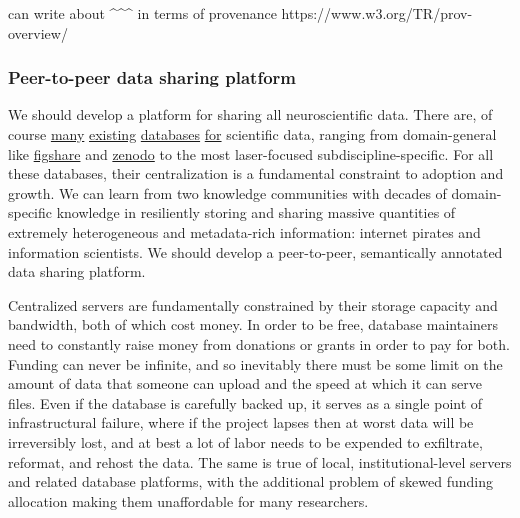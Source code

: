 \documentclass[nohyper]{tufte-book-jls}
\begin{document}
\begin{leftbar}
\begin{leftbar}
\begin{leftbar}
can write about \^{}\^{}\^{} in terms of provenance
https://www.w3.org/TR/prov-overview/
\end{leftbar}
\end{leftbar}
\end{leftbar}

\hypertarget{peer-to-peer-data-sharing-platform}{%
\subsubsection{Peer-to-peer data sharing
platform}\label{peer-to-peer-data-sharing-platform}}

We should develop a platform for sharing all neuroscientific data. There
are, of course \href{https://www.dandiarchive.org/}{many}
\href{https://openneuro.org/}{existing}
\href{https://www.brainminds.riken.jp/}{databases}
\href{https://biccn.org/}{for} scientific data, ranging from
domain-general like \href{https://figshare.com/}{figshare} and
\href{https://zenodo.org/}{zenodo} to the most laser-focused
subdiscipline-specific. For all these databases, their centralization is
a fundamental constraint to adoption and growth. We can learn from two
knowledge communities with decades of domain-specific knowledge in
resiliently storing and sharing massive quantities of extremely
heterogeneous and metadata-rich information: internet pirates and
information scientists. We should develop a peer-to-peer, semantically
annotated data sharing platform.

Centralized servers are fundamentally constrained by their storage
capacity and bandwidth, both of which cost money. In order to be free,
database maintainers need to constantly raise money from donations or
grants in order to pay for both. Funding can never be infinite, and so
inevitably there must be some limit on the amount of data that someone
can upload and the speed at which it can serve files. Even if
the database is carefully backed up, it serves as a single point of
infrastructural failure, where if the project lapses then at worst data
will be irreversibly lost, and at best a lot of labor needs to be
expended to exfiltrate, reformat, and rehost the data. The same is true
of local, institutional-level servers and related database platforms,
with the additional problem of skewed funding allocation making them
unaffordable for many researchers.
\end{document}
